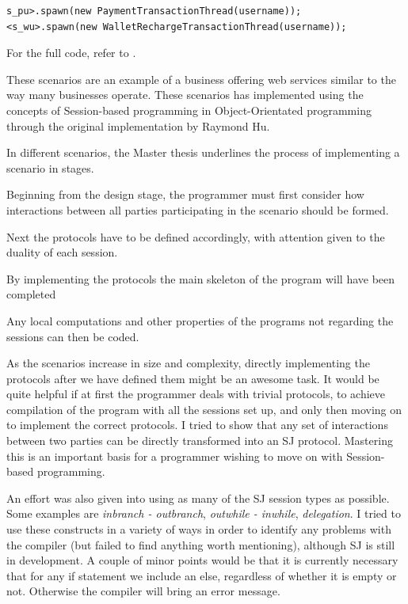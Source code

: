 \begin{lstlisting}
s_pu>.spawn(new PaymentTransactionThread(username));
<s_wu>.spawn(new WalletRechargeTransactionThread(username));
\end{lstlisting}

For the full code, refer to \cite{thesis}.

These scenarios are an example of a business offering web services similar to the way many businesses operate. These scenarios has implemented using the concepts of Session-based programming in Object-Orientated programming through the original implementation by Raymond Hu.

In different scenarios, the Master thesis underlines the process of implementing a scenario in stages.

\begin{compactenum}
\item  Beginning from the design stage, the programmer must first consider how interactions between all parties participating in the scenario should be formed.

\item  Next the protocols have to be defined accordingly, with attention given to the duality of each session.

\item  By implementing the protocols the main skeleton of the program will have been completed

\item  Any local computations and other properties of the programs not regarding the sessions can then be coded.
\end{compactenum}

As the scenarios increase in size and complexity, directly implementing the protocols after we have defined them might be an awesome task. It would be quite helpful if at first the programmer deals with trivial protocols, to achieve compilation of the program with all the sessions set up, and only then moving on to implement the correct protocols. I tried to show that any set of interactions between two parties can be directly transformed into an SJ protocol. Mastering this is an important basis for a programmer wishing to move on with Session-based programming.

An effort was also given into using as many of the SJ session types as possible. Some examples are \textit{inbranch - outbranch}, \textit{outwhile - inwhile}, \textit{delegation}. I tried to use these constructs in a variety of ways in order to identify any problems with the compiler (but failed to find anything worth mentioning), although SJ is still in development. A couple of minor points would be that it is currently necessary that for any if statement we include an else, regardless of whether it is empty or not. Otherwise the compiler will bring an error message. 